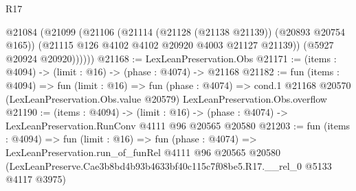 \begin{lexlean}{R17}
\begin{coremodule}
          @21084
            (@21099
              (@21106
                (@21114 (@21128 (@21138 @21139)) (@20893 @20754 @165))
                (@21115 @126 @4102 @4102 @20920 @4003 @21127 @21139))
              (@5927 @20924 @20920))))))
@21168 := LexLeanPreservation.Obs
@21171 := (items : @4094) -> (limit : @16) -> (phase : @4074) -> @21168
@21182 := fun (items : @4094) =>
  fun (limit : @16) =>
  fun (phase : @4074) =>
  cond.{1} @21168 @20570 (LexLeanPreservation.Obs.value @20579) LexLeanPreservation.Obs.overflow
@21190 := (items : @4094) ->
  (limit : @16) -> (phase : @4074) -> LexLeanPreservation.RunConv @4111 @96 @20565 @20580
@21203 := fun (items : @4094) =>
  fun (limit : @16) =>
  fun (phase : @4074) =>
  LexLeanPreservation.run_of_funRel
    @4111
    @96
    @20565
    @20580
    (LexLeanPreserve.Cae3b8bd4b93b4633bf40c115c7f08be5.R17.__rel_0 @5133 @4117 @3975)
\end{coremodule}
\end{lexlean}
